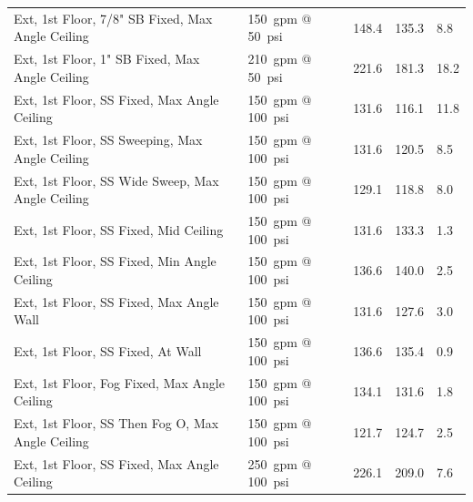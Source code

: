 \documentclass[12pt,oneside]{book}
\begin{document}
\begin{table}[!ht]
\begin{tabular}{lllll}
Ext, 1st Floor, 7/8" SB Fixed, Max Angle Ceiling      & 150~gpm @ 50~psi               & 148.4                             & 135.3                              & 8.8                    \\
Ext, 1st Floor, 1" SB Fixed, Max Angle Ceiling        & 210~gpm @ 50~psi               & 221.6                             & 181.3                              & 18.2                   \\
Ext, 1st Floor, SS Fixed, Max Angle Ceiling           & 150~gpm @ 100~psi              & 131.6                             & 116.1                              & 11.8                   \\
Ext, 1st Floor, SS Sweeping, Max Angle Ceiling        & 150~gpm @ 100~psi              & 131.6                             & 120.5                              & 8.5                    \\
Ext, 1st Floor, SS Wide Sweep, Max Angle Ceiling      & 150~gpm @ 100~psi              & 129.1                             & 118.8                              & 8.0                    \\
Ext, 1st Floor, SS Fixed, Mid Ceiling                 & 150~gpm @ 100~psi              & 131.6                             & 133.3                              & 1.3                    \\
Ext, 1st Floor, SS Fixed, Min Angle Ceiling           & 150~gpm @ 100~psi              & 136.6                             & 140.0                              & 2.5                    \\
Ext, 1st Floor, SS Fixed, Max Angle Wall              & 150~gpm @ 100~psi              & 131.6                             & 127.6                              & 3.0                    \\
Ext, 1st Floor, SS Fixed, At Wall                     & 150~gpm @ 100~psi              & 136.6                             & 135.4                              & 0.9                    \\
Ext, 1st Floor, Fog Fixed, Max Angle Ceiling          & 150~gpm @ 100~psi              & 134.1                             & 131.6                              & 1.8                    \\
Ext, 1st Floor, SS Then Fog O, Max Angle Ceiling      & 150~gpm @ 100~psi              & 121.7                             & 124.7                              & 2.5                    \\
Ext, 1st Floor, SS Fixed, Max Angle Ceiling           & 250~gpm @ 100~psi              & 226.1                             & 209.0                              & 7.6                    \\

\end{tabular}
\end{table}
\end{document}

